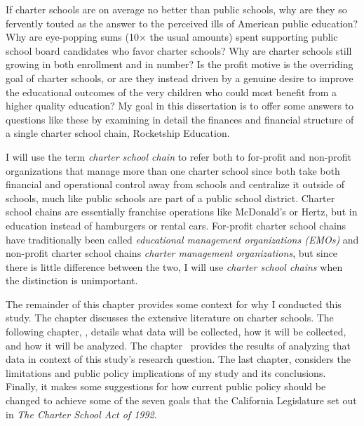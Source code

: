 If charter schools are on average no better than public schools, why are they so fervently touted as the answer to the perceived ills of American public education? Why are eye-popping sums (10× the usual amounts) spent supporting public school board candidates who favor charter schools? Why are charter schools still growing in both enrollment and in number? Is the profit motive is the overriding goal of charter schools, or are they instead driven by a genuine desire to improve the educational outcomes of the very children who could most benefit from a higher quality education? My goal in this dissertation is to offer some answers to questions like these by examining in detail the finances and financial structure of a single charter school chain, Rocketship Education.

I will use the term \textit{charter school chain} to refer both to for-profit and non-profit organizations that manage more than one charter school since both take both financial and operational control away from schools and centralize it outside of schools, much like public schools are part of a public school district.  Charter school chains are essentially franchise operations like McDonald's or Hertz, but in education instead of hamburgers or rental cars. For-profit charter school chains have traditionally been called \textit{educational management organizations (EMOs)} and non-profit charter school chains \textit{charter management organizations}, but since there is little difference between the two, I will use \textit{charter school chains} when the distinction is unimportant.

The remainder of this chapter provides some context for why I conducted this study. The chapter \textit{} discusses the extensive literature on charter schools. The following chapter, \textit{}, details what data will be collected, how it will be collected, and how it will be analyzed. The chapter~\textit{} provides the results of analyzing that data in context of this study's research question. The last chapter, \textit{} considers the limitations and public policy implications of my study and its conclusions. Finally, it makes some suggestions for how current public policy should be changed to achieve some of the seven goals that the California Legislature set out in \textit{The Charter School Act of 1992}.


